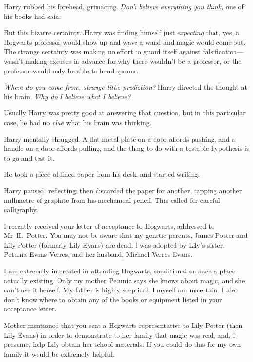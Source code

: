 Harry rubbed his forehead, grimacing. \emph{Don’t believe everything you think,} one of his books had said.

But this bizarre certainty…Harry was finding himself just \emph{expecting} that, yes, a Hogwarts professor would show up and wave a wand and magic would come out. The strange certainty was making no effort to guard itself against falsification—wasn’t making excuses in advance for why there wouldn’t be a professor, or the professor would only be able to bend spoons.

\emph{Where do you come from, strange little prediction?} Harry directed the thought at his brain. \emph{Why do I believe what I believe?}

Usually Harry was pretty good at answering that question, but in this particular case, he had no \emph{clue} what his brain was thinking.

Harry mentally shrugged. A flat metal plate on a door affords pushing, and a handle on a door affords pulling, and the thing to do with a testable hypothesis is to go and test it.

He took a piece of lined paper from his desk, and started writing.

\begin{writtenNote}
\end{writtenNote}

Harry paused, reflecting; then discarded the paper for another, tapping another millimetre of graphite from his mechanical pencil. This called for careful calligraphy.

\begin{writtenNote}


I recently received your letter of acceptance to Hogwarts, addressed to Mr~H.~Potter. You may not be aware that my genetic parents, James Potter and Lily Potter (formerly Lily Evans) are dead. I was adopted by Lily’s sister, Petunia Evans-Verres, and her husband, Michael Verres-Evans.

I am extremely interested in attending Hogwarts, conditional on such a place actually existing. Only my mother Petunia says she knows about magic, and she can’t use it herself. My father is highly sceptical. I myself am uncertain. I also don’t know where to obtain any of the books or equipment listed in your acceptance letter.

Mother mentioned that you sent a Hogwarts representative to Lily Potter (then Lily Evans) in order to demonstrate to her family that magic was real, and, I presume, help Lily obtain her school materials. If you could do this for my own family it would be extremely helpful.

\end{writtenNote}

